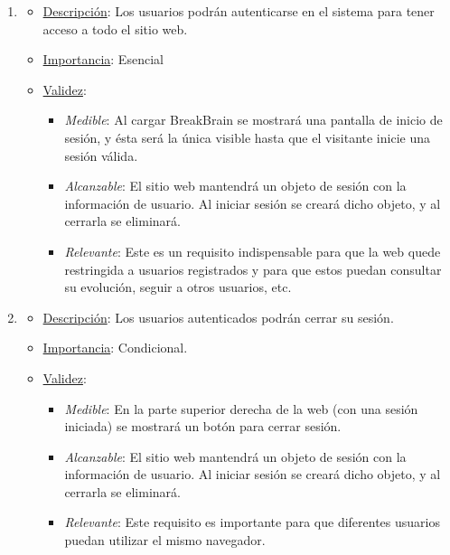 \begin{enumerate}
\item %
  \begin{itemize}
  \item \underline{Descripción}: Los usuarios podrán autenticarse en el sistema para tener acceso a todo el sitio web.
  \item \underline{Importancia}: Esencial
  \item \underline{Validez}:
    \begin{itemize}
    \item \textit{Medible}: Al cargar BreakBrain se mostrará una pantalla de inicio de sesión, y ésta será la única visible hasta que el visitante inicie una sesión válida.
    \item \textit{Alcanzable}: El sitio web mantendrá un objeto de sesión con la información de usuario. Al iniciar sesión se creará dicho objeto, y al cerrarla se eliminará.
    \item \textit{Relevante}: Este es un requisito indispensable para que la web quede restringida a usuarios registrados y para que estos puedan consultar su evolución, seguir a otros usuarios, etc.
    \end{itemize}
  \end{itemize}

\item %
  \begin{itemize}
  \item \underline{Descripción}: Los usuarios autenticados podrán cerrar su sesión.
  \item \underline{Importancia}: Condicional.
  \item \underline{Validez}:
    \begin{itemize}
    \item \textit{Medible}: En la parte superior derecha de la web (con una sesión iniciada) se mostrará un botón para cerrar sesión.
    \item \textit{Alcanzable}: El sitio web mantendrá un objeto de sesión con la información de usuario. Al iniciar sesión se creará dicho objeto, y al cerrarla se eliminará.
    \item \textit{Relevante}: Este requisito es importante para que diferentes usuarios puedan utilizar el mismo navegador.
    \end{itemize}
  \end{itemize}


\end{enumerate}
